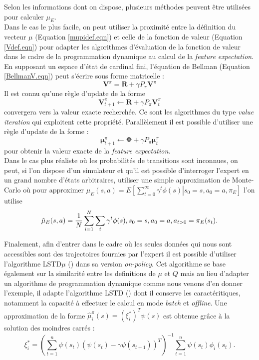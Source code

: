 \documentclass[publibook-draft]{CAp2012}
\begin{document}
Selon les informations dont on dispose, plusieurs méthodes peuvent être utilisées pour calculer $\mu_E$.\\

Dans le cas le plus facile, on peut utiliser la proximité entre la définition du vecteur $\mu$ (Equation \ref{mupidef.eqn}) et celle de la fonction de valeur (Equation \ref{Vdef.eqn}) pour adapter les algorithmes d'évaluation de la fonction de valeur dans le cadre de la programmation dynamique au calcul de la {\it feature expectation}.\\
En supposant un espace d'état de cardinal fini, l'équation de Bellman (Equation \ref{BellmanV.eqn}) peut s'écrire sous forme matricelle :
\begin{equation}
\mathbf V^\pi = \mathbf R + \gamma P_\pi\mathbf V^\pi
\end{equation}
Il est connu qu'une règle d'update de la forme 
\begin{equation}
\mathbf V^\pi_{t+1} \leftarrow \mathbf R + \gamma P_\pi\mathbf V^\pi_t
\end{equation}
convergera vers la valeur exacte recherchée. Ce sont les algorithmes du type \emph{value iteration} qui exploitent cette propriété. Parallèlement il est possible d'utiliser une règle d'update de la forme :
\begin{equation}
\mathbf \mu^\pi_{t+1} \leftarrow \mathbf\Phi + \gamma P_\pi\mathbf\mu^\pi_t
\end{equation}
pour obtenir la valeur exacte de la {\it feature expectation}.\\

Dans le cas plus réaliste où les probabilités de transitions sont inconnues, on peut, si l'on dispose d'un simulateur et qu'il est possible d'interroger l'expert en un grand nombre d'états arbitraires, utiliser une simple approximation de Monte-Carlo où pour approximer $\mu_E(s,a) = E\left.\left[\sum\limits_{t=0}^\infty \gamma^t \phi(s)\right|s_0 = s, a_0 = a, \pi_E\right]$ l'on utilise
\begin{equation}
\hat\mu_E(s,a) = {1\over N}\sum\limits_{i=1}^{N}\sum\limits_{t}\gamma^t\phi(s), s_0=s, a_0=a, a_{t>0} = \pi_E(s_t).
\end{equation}

Finalement, afin d'entrer dans le cadre où les seules données qui nous sont accessibles sont des trajectoires fournies par l'expert il est possible d'utiliser l'algorithme LSTD$\mu$ (\citep{klein2011batch}) dans sa version \emph{on-policy}. Cet algorithme se base également sur la similarité entre les definitions de $\mu$ et $Q$ mais au lieu d'adapter un algorithme de programmation dynamique comme nous venons d'en donner l'exemple, il adapte l'algorithme LSTD (\cite{bradtke1996linear}) dont il conserve les caractéritiques, notamment la capacité à effectuer le calcul en mode {\it batch} et {\it offline}. Une approximation de la forme $\hat{\mu}_i^\pi(s) = (\xi_i^*)^T \psi(s)$ est obtenue grâce à la solution des moindres carrés : 
\begin{equation}
  \xi_i^* = \left(\sum_{t=1}^n
  \psi(s_t)(\psi(s_t)-\gamma\psi(s_{t+1}))^T\right)^{-1}
  \sum_{t=1}^n \psi(s_t) \phi_i(s_t).
\end{equation}
\end{document}
